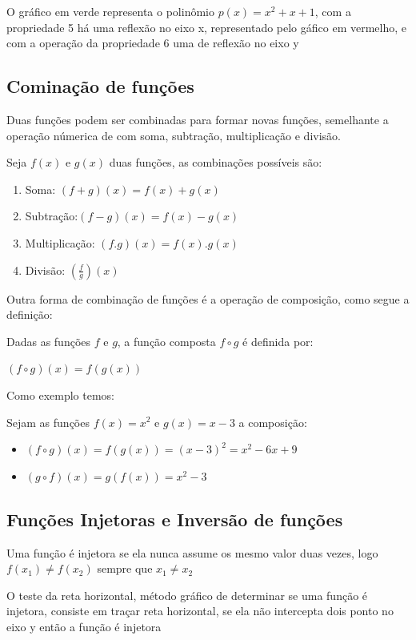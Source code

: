 \begin{multicols*}{2}
\begin{figure}[H]
    \end{figure}
    O gráfico em verde representa o polinômio $p(x) = x^2 + x +1$, com a propriedade 5 há uma 				reflexão no eixo x, representado pelo gáfico em vermelho, e com a operação da propriedade 6 uma 		de reflexão no eixo y


    \subsection{Cominação de funções}
    Duas funções podem ser combinadas para formar novas funções, semelhante a operação númerica de 			com soma, subtração, multiplicação e divisão.

    Seja $f(x)$ e $g(x)$ duas funções, as combinações possíveis são:
    \begin{enumerate}
        \item Soma: $(f+g)(x) = f(x) + g(x)$
        \item Subtração:$(f-g)(x) = f(x) - g(x)$
        \item Multiplicação: $(f.g)(x) = f(x).g(x)$
        \item Divisão: $\left( \frac{f}{g} \right)(x)$
    \end{enumerate}

    Outra forma de combinação de funções é a operação de composição, como segue a definição:

    \begin{theorem}
        Dadas as funções $f$ e $g$, a função composta $f \circ g$ é definida por:

        $(f \circ g)(x) = f(g(x))$
    \end{theorem}
    Como exemplo temos:

    Sejam as funções $f(x) = x^2$ e $g(x) = x -3 $ a composição:
    \begin{itemize}
        \item $(f \circ g)(x) = f(g(x)) = (x-3)^2 = x^2 -6x + 9$
        \item $(g \circ f)(x) = g(f(x)) = x^2 - 3$
    \end{itemize}

    \subsection{Funções Injetoras e Inversão de funções}
    Uma função é injetora se ela nunca assume os mesmo valor duas vezes, logo $f(x_1) \ne f(x_2)$ 			sempre que $x_1 \ne x_2$

    \begin{theorem}
        O teste da reta horizontal, método gráfico de determinar se uma função é injetora, consiste em 			traçar reta horizontal, se ela não intercepta dois ponto no eixo y então a função é injetora
    \end{theorem}


\end{multicols*}
